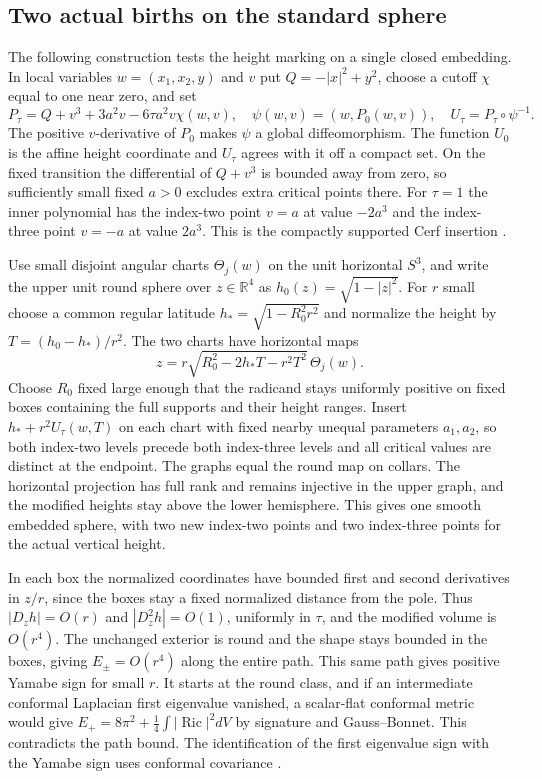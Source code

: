 \documentclass[11pt,letterpaper]{article}
\numberwithin{equation}{section}
\theoremstyle{definition}
\begin{document}
\subsection{Two actual births on the standard sphere}

The following construction tests the height marking on a single
closed embedding. In local variables \(w=(x_1,x_2,y)\) and \(v\)
put \(Q=-|x|^2+y^2\), choose a cutoff \(\chi\) equal to one
near zero, and set
\[
 P_\tau=Q+v^3+3a^2v-6\tau a^2v\chi(w,v),\quad
 \psi(w,v)=(w,P_0(w,v)),\quad U_\tau=P_\tau\circ\psi^{-1}.
\]
The positive \(v\)-derivative of \(P_0\) makes \(\psi\) a
global diffeomorphism. The function \(U_0\) is the affine
height coordinate and \(U_\tau\) agrees with it off a compact
set. On the fixed transition the differential of \(Q+v^3\)
is bounded away from zero, so sufficiently small fixed \(a>0\)
excludes extra critical points there. For \(\tau=1\) the
inner polynomial has the index-two point \(v=a\) at value
\(-2a^3\) and the index-three point \(v=-a\) at value \(2a^3\).
This is the compactly supported Cerf insertion
\cite[\S3.5, equation (3.5.1)]{BorodzikPowellTeichner2025LinkConcordance}.

Use small disjoint angular charts \(\Theta_j(w)\) on the unit
horizontal \(S^3\), and write the upper unit round sphere over
\(z\in\mathbb R^4\) as \(h_0(z)=\sqrt{1-|z|^2}\).
For \(r\) small choose a common regular latitude
\(h_*=\sqrt{1-R_0^2r^2}\) and normalize the height by
\(T=(h_0-h_*)/r^2\). The two charts have horizontal maps
\[
 z=r\sqrt{R_0^2-2h_*T-r^2T^2}\,\Theta_j(w).
\]
Choose \(R_0\) fixed large enough that the radicand stays
uniformly positive on fixed boxes containing the full supports
and their height ranges. Insert \(h_*+r^2U_\tau(w,T)\) on
each chart with fixed nearby unequal parameters
\(a_1,a_2\), so both index-two levels precede both index-three
levels and all critical values are distinct at the endpoint.
The graphs equal the round map on collars. The horizontal
projection has full rank and remains injective in the upper
graph, and the modified heights stay above the lower hemisphere.
This gives one smooth embedded sphere, with two new index-two
points and two index-three points for the actual vertical height.

In each box the normalized coordinates have bounded first and
second derivatives in \(z/r\), since the boxes stay a
fixed normalized distance from the pole. Thus \(|D_z h|=O(r)\)
and \(|D_z^2h|=O(1)\), uniformly in \(\tau\), and the modified
volume is \(O(r^4)\). The unchanged exterior is round and the
shape stays bounded in the boxes, giving \(E_\pm=O(r^4)\)
along the entire path. This same path gives positive Yamabe
sign for small \(r\). It starts at the round class, and if
an intermediate conformal Laplacian first eigenvalue vanished,
a scalar-flat conformal metric would give
\(E_+=8\pi^2+\frac14\int|\operatorname{Ric}|^2dV\)
by signature and Gauss--Bonnet. This contradicts the path
bound. The identification of the first eigenvalue sign with the
Yamabe sign uses conformal covariance
\cite[\S2]{LeeParker1987Yamabe}.
\end{document}

